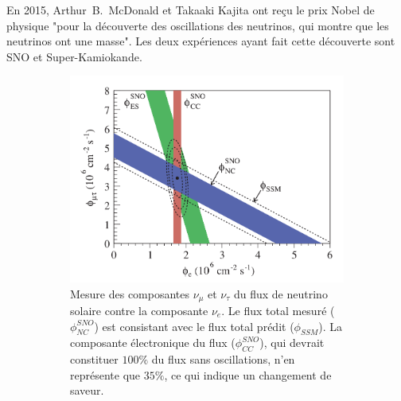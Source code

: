             En 2015, Arthur~B.~McDonald et Takaaki Kajita ont reçu le prix Nobel de physique "pour la découverte des oscillations des neutrinos, qui montre que les neutrinos ont une masse". Les deux expériences ayant fait cette découverte sont SNO\cite{Aharmim2013} et Super-Kamiokande\cite{Fukuda1998}.
            
            \begin{figure}[htbp]
                \begin{subfigure}[t]{0.56\textwidth}
                    \includegraphics[width=\textwidth]{Chapitre_1/pictures/SNO_plot.png}
                    \caption{Mesure des composantes $\nu_{\mu}$ et $\nu_{\tau}$ du flux de neutrino solaire contre la composante $\nu_e$\cite{Aharmim2013}. Le flux total mesuré ($\phi_{NC}^{SNO}$) est consistant avec le flux total prédit ($\phi_{SSM}$). La composante électronique du flux ($\phi_{CC}^{SNO}$), qui devrait constituer $100\%$ du flux sans oscillations, n'en représente que $35\%$, ce qui indique un changement de saveur.}
                    \label{fig::SNO_plot}
                \end{subfigure}
                \hfill 
                \begin{subfigure}[t]{0.4\textwidth}

\end{subfigure}
\end{figure}
